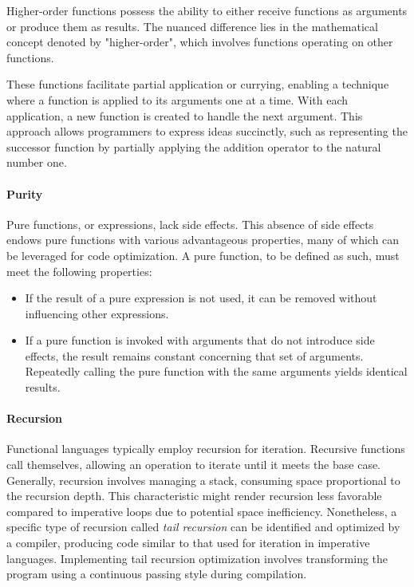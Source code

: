 Higher-order functions possess the ability to either receive functions as arguments or produce them as results. The nuanced difference lies in the mathematical concept denoted by "higher-order", which involves functions operating on other functions.

These functions facilitate partial application or currying, enabling a technique where a function is applied to its arguments one at a time. With each application, a new function is created to handle the next argument. This approach allows programmers to express ideas succinctly, such as representing the successor function by partially applying the addition operator to the natural number one.

\paragraph{Purity}
Pure functions, or expressions, lack side effects. This absence of side effects endows pure functions with various advantageous properties, many of which can be leveraged for code optimization. A pure function, to be defined as such, must meet the following properties:

\begin{itemize}
    \item If the result of a pure expression is not used, it can be removed without influencing other expressions.
    \item If a pure function is invoked with arguments that do not introduce side effects, the result remains constant concerning that set of arguments. Repeatedly calling the pure function with the same arguments yields identical results.
\end{itemize}

\paragraph{Recursion}

Functional languages typically employ recursion for iteration. Recursive functions call themselves, allowing an operation to iterate until it meets the base case. Generally, recursion involves managing a stack, consuming space proportional to the recursion depth. This characteristic might render recursion less favorable compared to imperative loops due to potential space inefficiency. Nonetheless, a specific type of recursion called \textit{tail recursion} can be identified and optimized by a compiler, producing code similar to that used for iteration in imperative languages. Implementing tail recursion optimization involves transforming the program using a continuous passing style during compilation.

